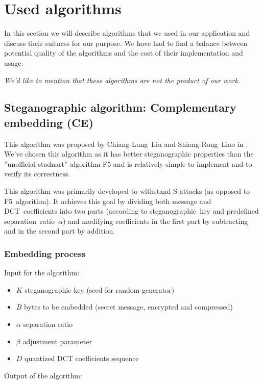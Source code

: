 \section{Used algorithms}
In this section we will describe algorithms that we used in our application
and discuss their suitness for our purpose. 
We have had to find a balance between potential quality of the algorithms 
and the cost of their implementation and usage.

\textit{We'd like to mention that these algorithms are not the product of our work.}

\subsection{Steganographic algorithm: Complementary embedding (CE)}

This algorithm was proposed by Chiang-Lung~Liu and Shiang-Rong~Liao in \cite{liu2008high}.
We've chosen this algorithm as it has better steganographic properties than the ''unofficial
stadnart'' algorithm F5 and is relatively simple to implement and to verify its correctness.

This algorithm was primarily developed to withstand S-attacks (as opposed to F5~algorithm).
It achieves this goal by dividing both message and DCT~coefficients into two parts
(according to steganographic~key and predefined separation~ratio~$\alpha$) and
modifying coefficients in the first part by subtracting and in the second part by addition.

\subsubsection{Embedding process}
\label{sssec:therory-embedding}
Input for the algorithm:

\begin{itemize}
    \item $K$ steganographic key (seed for random generator)
    \item $B$ bytes to be embedded (secret message, encrypted and compressed)
    \item $\alpha$ separation ratio
    \item $\beta$ adjustment parameter
    \item $D$ quantized DCT coefficients sequence
\end{itemize}

Output of the algorithm:

